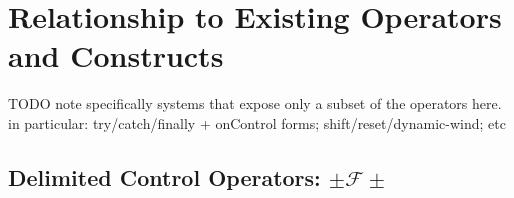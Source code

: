 \documentclass[11pt]{article}
\newcommand{\hasType}[4]{#1 #2 \vdash #3 : #4}
\newcommand{\pushSubcont}[2]{\textsf{restore}\;#1\;#2}
\newcommand{\onWind}[2]{\textsf{onWind}\;#1;\;#2}
\newcommand{\onUnwind}[2]{\textsf{onUnwind}\;#1;\;#2}
\newcommand{\onAbort}[2]{\textsf{onAbort}\;#1;\;#2}
\begin{document}


\section{Relationship to Existing Operators and Constructs}
\label{relationship}

TODO note specifically systems that expose only a subset of the operators here. in particular: try/catch/finally + onControl forms; shift/reset/dynamic-wind; etc

\subsection{Delimited Control Operators: $\pm\mathcal{F}\pm$}
\end{document}
